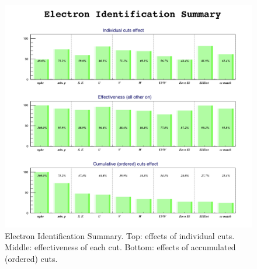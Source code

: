 \begin{figure}[hb]
  \centering
		\includegraphics[width=1.05\textwidth]{img/epidsummary.png}
		\caption{Electron Identification Summary. Top: effects of individual cuts.
		         Middle: effectiveness of each cut.
               Bottom: effects of accumulated (ordered) cuts.}
 		\label{fig:epidsummary}
\end{figure}



\clearpage\newpage










